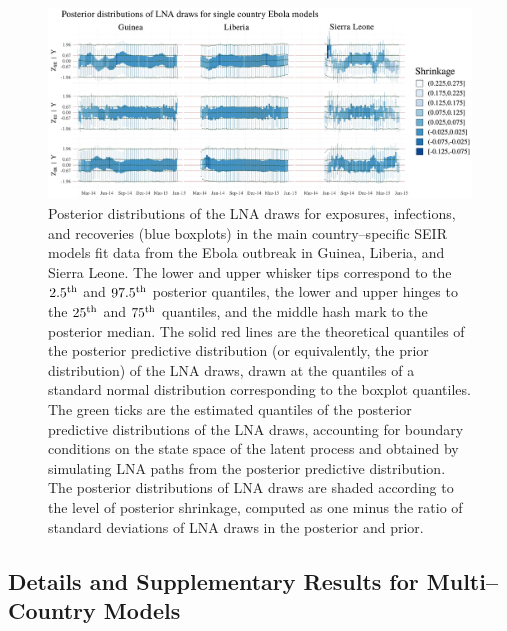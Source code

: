 \begin{figure}
	\begin{fullpage}
		\centering
		\includegraphics[width=\linewidth]{figures/ebola_single_drawplots}
		\caption[Posterior distributions of LNA draws for the main country--specific SEIR models fit to data from the West Africa Ebola outbreak.]{Posterior distributions of the LNA draws for exposures, infections, and recoveries (blue boxplots) in the main country--specific SEIR models fit data from the Ebola outbreak in Guinea, Liberia, and Sierra Leone. The lower and upper whisker tips correspond to the $ 2.5^{\mathrm{th}} $ and $ 97.5^{\mathrm{th}} $ posterior quantiles, the lower and upper hinges to the $ 25^{\mathrm{th}} $ and $ 75^{\mathrm{th}} $ quantiles, and the middle hash mark to the posterior median. The solid red lines are the theoretical quantiles of the posterior predictive distribution (or equivalently, the prior distribution) of the LNA draws, drawn at the quantiles of a standard normal distribution corresponding to the boxplot quantiles. The green ticks are the estimated quantiles of the posterior predictive distributions of the LNA draws, accounting for boundary conditions on the state space of the latent process and obtained by simulating LNA paths from the posterior predictive distribution.  The posterior distributions of LNA draws are shaded according to the level of posterior shrinkage, computed as one minus the ratio of standard deviations of LNA draws in the posterior and prior.}
		\label{fig:ebola_single_drawplots}
	\end{fullpage}
\end{figure}

\newpage
\subsection{Details and Supplementary Results for Multi--Country Models}
\label{subsec:ebola_joint_supplement}

